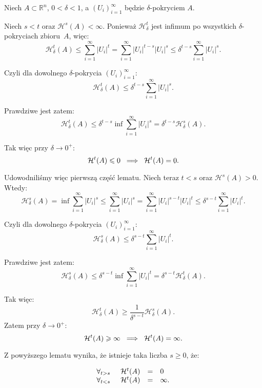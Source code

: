 \documentclass{mini}
\begin{document}
\begin{dow}

Niech $A \subset \mathbb{R}^n$, $0<\delta<1$, a $(U_i)_{i=1}^{\infty}$ będzie $\delta$-pokryciem $A$. 

Niech $s<t$ oraz $\mathcal{H}^s(A)<\infty$. Ponieważ $\mathcal{H}_{\delta}^t$ jest infimum po wszystkich $\delta$-pokryciach zbioru~$A$, więc:
$$ 
\mathcal{H}_{\delta}^t(A) \leqslant \sum_{i=1}^{\infty} |U_i|^t = \sum_{i=1}^{\infty} |U_i|^{t-s} |U_i|^s \leqslant \delta^{t-s} \sum_{i=1}^{\infty} |U_i|^s.  
$$

Czyli dla dowolnego $\delta$-pokrycia $(U_i)_{i=1}^{\infty}$:
$$
\mathcal{H}_{\delta}^t(A)\leqslant \delta^{t-s} \sum_{i=1}^{\infty} |U_i|^s.
$$ 

Prawdziwe jest zatem:
$$
\mathcal{H}_{\delta}^t(A)\leqslant \delta^{t-s} \inf\sum_{i=1}^{\infty} |U_i|^s= \delta^{t-s} \mathcal{H}_{\delta}^s(A).
$$ 

Tak więc przy $\delta\longrightarrow 0^+$:
$$
\mathcal{H}^t(A)\leqslant 0\hspace{2mm} \Longrightarrow\hspace{2mm} \mathcal{H}^t(A)= 0.
$$

Udowodniliśmy więc pierwszą część lematu. Niech teraz $t<s$ oraz $\mathcal{H}^s(A)>0$. Wtedy:
$$ 
\mathcal{H}_{\delta}^s(A)=\inf \sum_{i=1}^{\infty} |U_i|^s \leqslant \sum_{i=1}^{\infty} |U_i|^s = \sum_{i=1}^{\infty} |U_i|^{s-t} |U_i|^t \leqslant \delta^{s-t} \sum_{i=1}^{\infty} |U_i|^t. 
$$

Czyli dla dowolnego $\delta$-pokrycia $(U_i)_{i=1}^{\infty}$:
$$
\mathcal{H}_{\delta}^s(A)\leqslant \delta^{s-t} \sum_{i=1}^{\infty} |U_i|^t.
$$ 

Prawdziwe jest zatem:
$$
\mathcal{H}_{\delta}^s(A)\leqslant \delta^{s-t} \inf\sum_{i=1}^{\infty} |U_i|^t= \delta^{s-t} \mathcal{H}_{\delta}^t(A).
$$ 

Tak więc:
$$ 
\mathcal{H}_{\delta}^t(A)\geqslant \frac{1}{\delta^{s-t}} \mathcal{H}_{\delta}^s(A).
$$
\newpage
Zatem przy $\delta\longrightarrow 0^+$:
$$
\mathcal{H}^t(A)\geqslant \infty\hspace{2mm} \Longrightarrow\hspace{2mm} \mathcal{H}^t(A)= \infty.
$$
\end{dow}

Z powyższego lematu wynika, że istnieje taka liczba $s\geqslant0$, że:

$$ 
\begin{array}{rcl}
\forall_{t>s} \hspace{5mm} \mathcal{H}^t(A)&=&0 \\
\forall_{t<s} \hspace{5mm} \mathcal{H}^t(A)&=&\infty.
\end{array} 
$$
\end{document}
